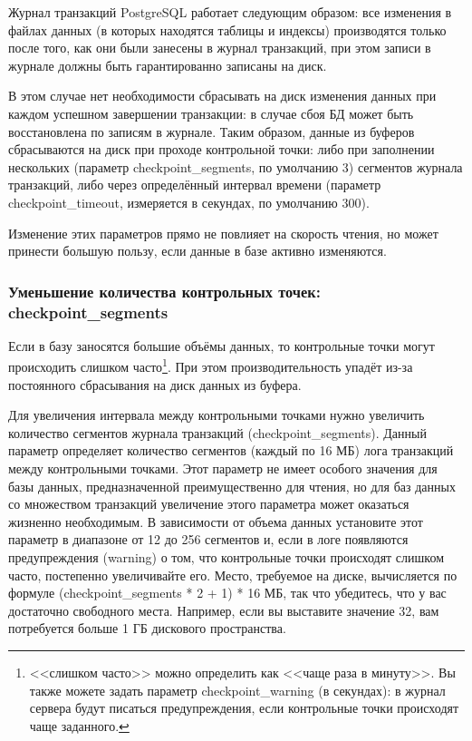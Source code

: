 Журнал транзакций PostgreSQL работает следующим образом: все изменения в файлах данных (в которых находятся таблицы и индексы) производятся только после того, как они были занесены в журнал транзакций, при этом записи в журнале должны быть гарантированно записаны на диск.

В этом случае нет необходимости сбрасывать на диск изменения данных при каждом успешном завершении транзакции: в случае сбоя БД может быть восстановлена по записям в журнале. Таким образом, данные из буферов сбрасываются на диск при проходе контрольной точки: либо при заполнении нескольких (параметр checkpoint\_segments, по умолчанию 3) сегментов
журнала транзакций, либо через определённый интервал времени (параметр checkpoint\_timeout, измеряется в секундах, по умолчанию 300).

Изменение этих параметров прямо не повлияет на скорость чтения, но может принести большую пользу, если данные в базе активно изменяются.

\subsubsection{Уменьшение количества контрольных точек: checkpoint\_segments}

Если в базу заносятся большие объёмы данных, то контрольные точки могут происходить слишком часто\footnote{<<слишком часто>> можно определить как <<чаще раза в минуту>>. Вы также можете задать параметр checkpoint\_warning (в секундах): в журнал сервера будут писаться предупреждения, если контрольные точки происходят чаще заданного.}. При этом производительность упадёт из-за постоянного сбрасывания на диск данных из буфера.

Для увеличения интервала между контрольными точками нужно увеличить количество сегментов журнала транзакций (checkpoint\_segments). Данный параметр определяет количество сегментов (каждый по 16 МБ) лога транзакций между контрольными точками. Этот параметр не имеет особого значения для базы данных, предназначенной преимущественно для чтения, но для баз данных со множеством транзакций увеличение этого параметра может оказаться жизненно необходимым. В зависимости от объема данных установите этот параметр в диапазоне от 12 до 256 сегментов и, если в логе появляются предупреждения (warning) о том, что контрольные точки происходят слишком часто, постепенно увеличивайте его. Место, требуемое на диске, вычисляется по формуле (checkpoint\_segments * 2 + 1) * 16 МБ, так что убедитесь, что у вас достаточно свободного места. Например, если вы выставите значение 32, вам потребуется больше 1 ГБ дискового пространства.

